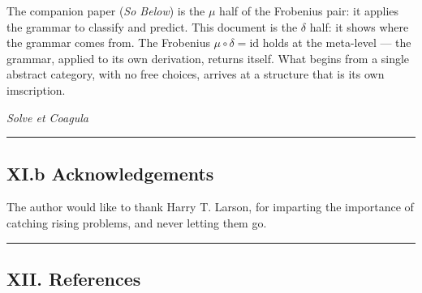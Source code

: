 \documentclass[12pt,a4paper]{article}
\begin{document}
The companion paper (\emph{So Below}) is the $\mu$ half of the Frobenius pair: it applies the grammar to classify and
predict. This document is the $\delta$ half: it shows where the grammar comes from. The Frobenius
$\mu \circ \delta = \text{id}$ holds at the meta-level --- the grammar, applied to its own derivation, returns itself. What begins
from a single abstract category, with no free choices, arrives at a structure that is its own imscription.

\begin{center}
\medskip
\textit{Solve et Coagula}
\medskip
\end{center}

\begin{center}
\rule{0.5\textwidth}{0.4pt}
\end{center}


\subsection{XI.b Acknowledgements}

The author would like to thank Harry T. Larson, for imparting the importance of catching rising problems, and never letting them go.

\begin{center}
\rule{0.5\textwidth}{0.4pt}
\end{center}


\subsection{XII. References}
\end{document}
